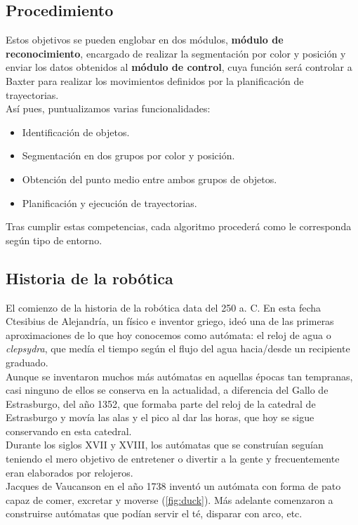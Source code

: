 \subsection{Procedimiento}
\noindent Estos objetivos se pueden englobar en dos módulos, \textbf{módulo de reconocimiento}, encargado de realizar la segmentación por color y posición y enviar los datos obtenidos al \textbf{módulo de control}, cuya función será controlar a Baxter para realizar los movimientos definidos por la planificación de trayectorias. \\
\noindent Así pues, puntualizamos varias funcionalidades:

\begin{itemize}
	\item Identificación de objetos.
	\item Segmentación en dos grupos por color y posición.
	\item Obtención del punto medio entre ambos grupos de objetos.
	\item Planificación y ejecución de trayectorias.
\end{itemize}

\noindent Tras cumplir estas competencias, cada algoritmo procederá como le corresponda según tipo de entorno.

\subsection{Historia de la robótica}
\noindent El comienzo de la historia de la robótica data del 250 a. C. \cite{Robotic} En esta fecha Ctesibius de Alejandría, un físico e inventor griego, ideó una de las primeras aproximaciones de lo que hoy conocemos como autómata: el reloj de agua o \textit{clepsydra}, que medía el tiempo según el flujo del agua hacia/desde un recipiente graduado. \\

\noindent Aunque se inventaron muchos más autómatas en aquellas épocas tan tempranas, casi ninguno de ellos se conserva en la actualidad, a diferencia del Gallo de Estrasburgo, del año 1352, que formaba parte del reloj de la catedral de Estrasburgo y movía las alas y el pico al dar las horas, que hoy se sigue conservando en esta catedral. \\

\noindent Durante los siglos XVII y XVIII, los autómatas que se construían seguían teniendo el mero objetivo de entretener o divertir a la gente y frecuentemente eran elaborados por relojeros. \\
\noindent Jacques de Vaucanson en el año 1738 inventó un autómata con forma de pato capaz de comer, excretar y moverse (\ref{fig:duck}). Más adelante comenzaron a construirse autómatas que podían servir el té, disparar con arco, etc. \\

